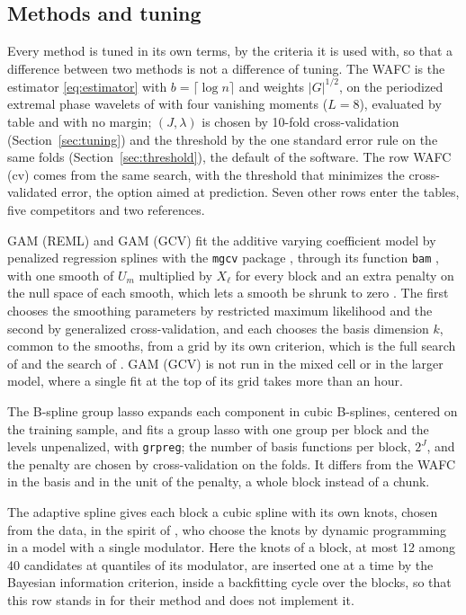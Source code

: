 \documentclass[12pt]{article} %
\theoremstyle{definition}
\theoremstyle{plain}
\newcommand{\cv}{\ell}
\newcommand{\md}{m}
\newcommand{\pen}{\lambda}
\begin{document}
{\subsection{Methods and tuning}
\label{sec:sim-methods}

Every method is tuned in its own terms, by the criteria it is used with, so
that a difference between two methods is not a difference of tuning. The WAFC
is the estimator \eqref{eq:estimator} with $b = \lceil\log n\rceil$ and
weights $|G|^{1/2}$, on the periodized extremal phase wavelets of
\citet{Daubechies-1992} with four vanishing moments ($L = 8$), evaluated by
table and with no margin; $(J,\pen)$ is chosen by 10-fold cross-validation
(Section~\ref{sec:tuning}) and the threshold by the one standard error rule on
the same folds (Section~\ref{sec:threshold}), the default of the software. The
row WAFC (cv) comes from the same search, with the threshold that minimizes
the cross-validated error, the option aimed at prediction. Seven other rows
enter the tables, five competitors and two references.

GAM (REML) and GAM (GCV) fit the additive varying coefficient model by
penalized regression splines with the \texttt{mgcv} package
\citep{Wood-2017,Wood-mgcv-2025}, through its function \texttt{bam}
\citep{Wood-Goude-Shaw-2015}, with one smooth of $U_\md$ multiplied by $X_\cv$
for every block and an extra penalty on the null space of each smooth, which
lets a smooth be shrunk to zero \citep{Marra-Wood-2011}. The first chooses the
smoothing parameters by restricted maximum likelihood and the second by
generalized cross-validation, and each chooses the basis dimension $k$, common
to the smooths, from a grid by its own criterion, which is the full search of
\citet{Ruppert-2002} and the search of \citet[Section~2.3]{Pya-Wood-2016}. GAM
(GCV) is not run in the mixed cell or in the larger model, where a single fit
at the top of its grid takes more than an hour.

The B-spline group lasso expands each component in cubic B-splines, centered
on the training sample, and fits a group lasso \citep{Yuan-Lin-2006} with one
group per block and the levels unpenalized, with \texttt{grpreg}; the number
of basis functions per block, $2^J$, and the penalty are chosen by
cross-validation on the folds. It differs from the WAFC in the basis and in
the unit of the penalty, a whole block instead of a chunk.

The adaptive spline gives each block a cubic spline with its own knots, chosen
from the data, in the spirit of \citet{Wang-Jiang-Liu-2024}, who choose the
knots by dynamic programming in a model with a single modulator. Here the
knots of a block, at most 12 among 40 candidates at quantiles of its
modulator, are inserted one at a time by the Bayesian information criterion,
inside a backfitting cycle over the blocks, so that this row stands in for
their method and does not implement it.

}
\end{document}
